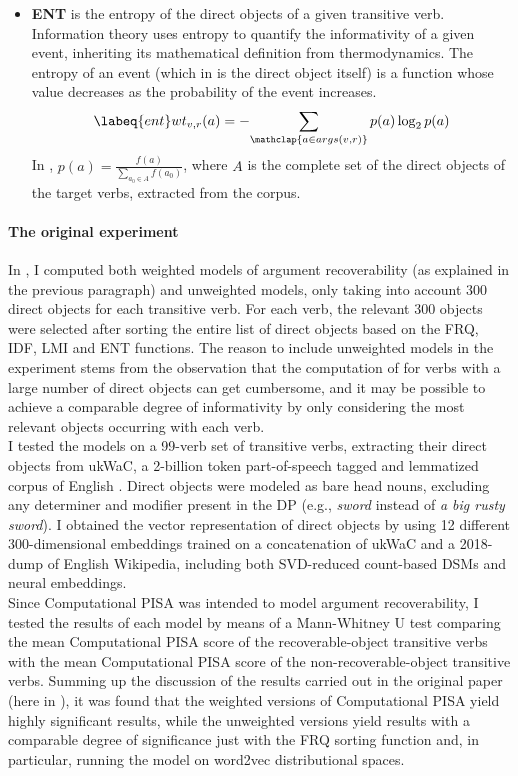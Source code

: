 \begin{itemize}
\item \textbf{ENT} is the entropy \parencite{shannon1948mathematical} of the direct objects of a given transitive verb. Information theory uses entropy to quantify the informativity of a given event, inheriting its mathematical definition from thermodynamics. The entropy of an event (which in  is the direct object itself) is a function whose value decreases as the probability of the event increases.
 \begin{equation} \labeq{ent}
wt_{v,r}(a) = -\!\sum_{\mathclap{a \in args(v,r)}} p(a) \log _{2}p(a)
\end{equation}
In , $p(a) = \frac{f(a)}{\sum_{a_0 \in A}f(a_0)}$, where $A$ is the complete set of the direct objects of the target verbs, extracted from the corpus.
\end{itemize}

\paragraph{The original experiment}
In \textcite{CappelliLenciPISA}, I computed both weighted models of argument recoverability (as explained in the previous paragraph) and unweighted models, only taking into account 300 direct objects for each transitive verb. For each verb, the relevant 300 objects were selected after sorting the entire list of direct objects based on the FRQ, IDF, LMI and ENT functions. The reason to include unweighted models in the experiment stems from the observation that the computation of  for verbs with a large number of direct objects can get cumbersome, and it may be possible to achieve a comparable degree of informativity by only considering the most relevant objects occurring with each verb.\\
I tested the models on a 99-verb set of transitive verbs, extracting their direct objects from ukWaC, a 2-billion token part-of-speech tagged and lemmatized corpus of English \parencite{FerraresiEtAl2008}. Direct objects were modeled as bare head nouns, excluding any determiner and modifier present in the DP (e.g., \textit{sword} instead of \textit{a big rusty sword}). I obtained the vector representation of direct objects by using 12 different 300-dimensional embeddings trained on a concatenation of ukWaC and a 2018-dump of English Wikipedia, including both SVD-reduced count-based DSMs and neural embeddings.\\
Since Computational PISA was intended to model argument recoverability, I tested the results of each model by means of a Mann-Whitney U test comparing the mean Computational PISA score of the recoverable-object transitive verbs with the mean Computational PISA score of the non-recoverable-object transitive verbs. Summing up the discussion of the results carried out in the original paper (here in ), it was found that the weighted versions of Computational PISA yield highly significant results, while the unweighted versions yield results with a comparable degree of significance just with the FRQ sorting function and, in particular, running the model on word2vec \parencite{mikolov2013efficient} distributional spaces.

